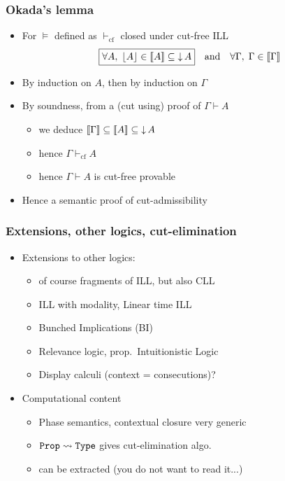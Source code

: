 \documentclass[xcolor=pdftex,graphicx=pdftex,12pt]{beamer}
\newcommand{\coq}[1]{\ensuremath{\mathalpha{\mathtt{#1}}}}
\newcommand{\sem}[1]{\llbracket{#1}\rrbracket}
\newcommand{\seq}{\mathrel\vdash}
\newcommand{\pable}{\mathrel{\models}}
\begin{document}
\begin{frame}

\frametitle{Okada's lemma}

\begin{itemize}
\item For ${\pable}$ defined as ${\seq_{\textrm{cf}}}$ closed under cut-free ILL
$$\fbox{$\forall A,\;\ulist A\in\sem A\subseteq\dc A$}\quad\text{and}\quad \forall\Gamma,\;\Gamma\in\sem\Gamma$$ 
\item By induction on $A$, then by induction on $\Gamma$
\item By soundness, from a (cut using) proof of $\Gamma\seq A$
  \begin{itemize}
  \item we deduce $\sem\Gamma\subseteq\sem A\subseteq\dc A$
  \item hence $\Gamma \seq_{\textrm{cf}} A$
  \item hence $\Gamma\seq A$ is cut-free provable
  \end{itemize}
\item Hence a semantic proof of cut-admissibility
\end{itemize}

\end{frame}

\begin{frame}

\frametitle{Extensions, other logics, cut-elimination}

\begin{itemize}
\item Extensions to other logics:
  \begin{itemize}
  \item of course fragments of ILL, but also CLL
  \item ILL with modality, Linear time ILL
  \item Bunched Implications (BI)
  \item Relevance logic, prop.\ Intuitionistic Logic
  \item Display calculi (context = consecutions)?
  \end{itemize}
\item Computational content
  \begin{itemize}
  \item Phase semantics, contextual closure very generic
  \item $\coq{Prop} \rightsquigarrow \coq{Type}$ gives cut-elimination algo.
  \item can be extracted (you do not want to read it...)
  \end{itemize}
\end{itemize}

\end{frame}
\end{document}
